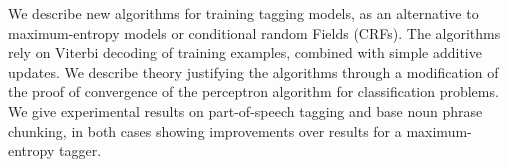 We describe new algorithms for training
tagging models, as an alternative
to maximum-entropy models or conditional
random Fields (CRFs). The algorithms
rely on Viterbi decoding of
training examples, combined with simple
additive updates. We describe theory
justifying the algorithms through
a modification of the proof of convergence
of the perceptron algorithm for
classification problems. We give experimental
results on part-of-speech tagging
and base noun phrase chunking, in
both cases showing improvements over
results for a maximum-entropy tagger.
